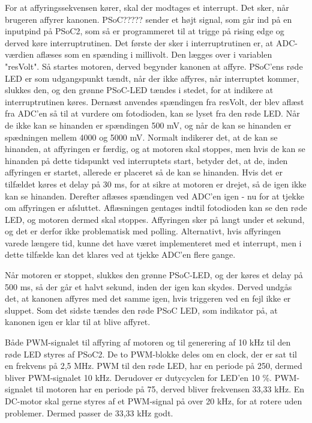 For at affyringssekvensen kører, skal der modtages et interrupt. Det sker, når brugeren affyrer kanonen. PSoC????? sender et højt signal, som går ind på en inputpind på PSoC2, som så er programmeret til at trigge på rising edge og derved køre interruptrutinen. 
Det første der sker i interruptrutinen er, at ADC-værdien aflæses som en spænding i millivolt. Den lægges over i variablen "resVolt". Så startes motoren, derved begynder kanonen at affyre. PSoC'ens røde LED er som udgangspunkt tændt, når der ikke affyres, når interruptet kommer, slukkes den, og den grønne PSoC-LED tændes i stedet, for at indikere at interruptrutinen køres. 
Dernæst anvendes spændingen fra resVolt, der blev aflæst fra ADC'en så til at vurdere om fotodioden, kan se lyset fra den røde LED. Når de ikke kan se hinanden er spændingen 500 mV, og når de kan se hinanden er spædningen mellem 4000 og 5000 mV. Normalt indikerer det, at de kan se hinanden, at affyringen er færdig, og at motoren skal stoppes, men hvis de kan se hinanden på dette tidspunkt ved interruptets start, betyder det, at de, inden affyringen er startet, allerede er placeret så de kan se hinanden. Hvis det er tilfældet køres et delay på 30 ms, for at sikre at motoren er drejet, så de igen ikke kan se hinanden. Derefter aflæses spændingen ved ADC'en igen - nu for at tjekke om affyringen er afsluttet. Aflæsningen gentages indtil fotodioden kan se den røde LED, og motoren dermed skal stoppes. Affyringen sker på langt under et sekund, og det er derfor ikke problematisk med polling. Alternativt, hvis affyringen varede længere tid, kunne det have været implementeret med et interrupt, men i dette tilfælde kan det klares ved at tjekke ADC'en flere gange. 

Når motoren er stoppet, slukkes den grønne PSoC-LED, og der køres et delay på 500 ms, så der går et halvt sekund, inden der igen kan skydes. Derved undgås det, at kanonen affyres med det samme igen, hvis triggeren ved en fejl ikke er sluppet. Som det sidste tændes den røde PSoC LED, som indikator på, at kanonen igen er klar til at blive affyret. 

Både PWM-signalet til affyring af motoren og til generering af 10 kHz til den røde LED styres af PSoC2. De to PWM-blokke deles om en clock, der er sat til en frekvens på 2,5 MHz. PWM til den røde LED, har en periode på 250, dermed bliver PWM-signalet 10 kHz. Derudover er dutycyclen for LED'en 10 \%. PWM-signalet til motoren har en periode på 75, derved bliver frekvensen 33,33 kHz. En DC-motor skal gerne styres af et PWM-signal på over 20 kHz, for at rotere uden problemer. Dermed passer de 33,33 kHz godt. 
